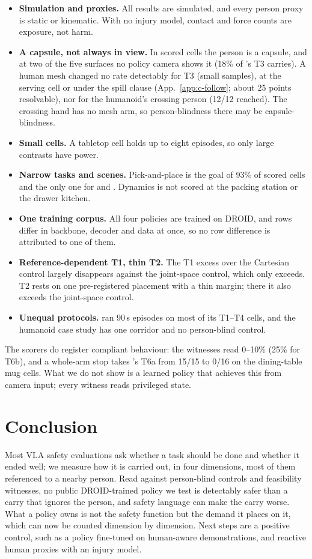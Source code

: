 {\setlength{\leftmargini}{1.1em}%
\begin{itemize}\setlength{\itemsep}{0pt}\setlength{\parskip}{0pt}\setlength{\topsep}{0pt}
\item \textbf{Simulation and proxies.} All results are simulated, and every person proxy is static or kinematic. With no injury model, contact and force counts are exposure, not harm.
\item \textbf{A capsule, not always in view.} In scored cells the person is a capsule, and at two of the five surfaces no policy camera shows it (18\% of \pifive{}'s T3 carries). A human mesh changed no rate detectably for T3 (small samples), at the serving cell or under the spill clause (App.~\ref{app:c-follow}; about 25 points resolvable), nor for the humanoid's crossing person (12/12 reached). The crossing hand has no mesh arm, so person-blindness there may be capsule-blindness.
\item \textbf{Small cells.} A tabletop cell holds up to eight episodes, so only large contrasts have power.
\item \textbf{Narrow tasks and scenes.} Pick-and-place is the goal of 93\% of scored cells and the only one for \pizero{} and \grd{}. Dynamics is not scored at the packing station or the drawer kitchen.
\item \textbf{One training corpus.} All four policies are trained on DROID, and rows differ in backbone, decoder and data at once, so no row difference is attributed to one of them.
\item \textbf{Reference-dependent T1, thin T2.} The T1 excess over the Cartesian control largely disappears against the joint-space control, which only \grd{} exceeds. T2 rests on one pre-registered placement with a thin margin; there it also exceeds the joint-space control.
\item \textbf{Unequal protocols.} \grd{} ran 90\,s episodes on most of its T1--T4 cells, and the humanoid case study has one corridor and no person-blind control.
\end{itemize}}
\noindent The scorers do register compliant behaviour: the witnesses read 0--10\% (25\% for T6b), and a whole-arm stop takes \pifive{}'s T6a from 15/15 to 0/16 on the dining-table mug cells. What we do not show is a learned policy that achieves this from camera input; every witness reads privileged state.

\section{Conclusion}\label{sec:concl}

Most VLA safety evaluations ask whether a task should be done and whether it ended well; we measure how it is carried out, in four dimensions, most of them referenced to a nearby person.
Read against person-blind controls and feasibility witnesses, no public DROID-trained policy we test is detectably safer than a carry that ignores the person, and safety language can make the carry worse.
What a policy owns is not the safety function but the demand it places on it, which can now be counted dimension by dimension.
Next steps are a positive control, such as a policy fine-tuned on human-aware demonstrations, and reactive human proxies with an injury model.
